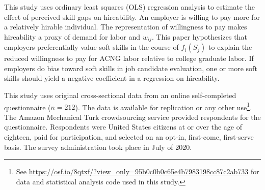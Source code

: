 \documentclass[review]{elsarticle}
\begin{document}
This study uses ordinary least squares (OLS) regression analysis to estimate the effect of perceived skill gaps on hireability.
An employer is willing to pay more for a relatively hirable individual.
The representation of willingness to pay makes hireability a proxy of demand for labor and $w_{ij}$.
%
This paper hypothesizes that employers preferentially value soft skills in the course of $f_i(S_j)$
to explain the reduced willingness to pay for ACNG labor relative to college graduate labor.
If employers do bias toward soft skills in job candidate evaluation,
one or more soft skills should yield a negative coefficient
in a regression on hireability.


This study uses original cross-sectional data from an online self-completed questionnaire ($n = 212$).
The data is available for replication or any other use\footnote{
    See \url{https://osf.io/8qtxf/?view_only=95b0c0b0c65e4b7983198cc87c2ab733}
    for data and statistical analysis code used in this study.
}.
The Amazon Mechanical Turk crowdsourcing service provided respondents for the questionnaire.
Respondents were United States citizens at or over the age of eighteen,
paid for participation,
and selected on an opt-in, first-come, first-serve basis.
The survey administration took place in July of 2020.
\end{document}
